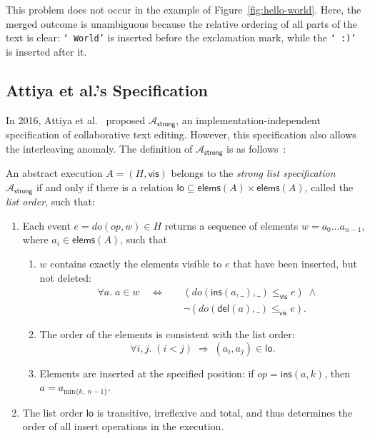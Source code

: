 \documentclass[sigconf]{acmart}
\begin{document}
This problem does not occur in the example of Figure~\ref{fig:hello-world}.
Here, the merged outcome is unambiguous because the relative ordering of all parts of the text is clear: \texttt{` World'} is inserted before the exclamation mark, while the \texttt{` :)'} is inserted after it.

\subsection{Attiya et al.'s Specification}

In 2016, Attiya et al.~\cite{Attiya:2016kh} proposed $\mathcal{A}_\textsf{strong}$, an implementation-independent specification of collaborative text editing.
However, this specification also allows the interleaving anomaly.
The definition of $\mathcal{A}_\textsf{strong}$ is as follows~\cite{Attiya:2016kh}:

\begin{displayquote}
  An abstract execution $A = (H, \textsf{vis})$ belongs to the \emph{strong list specification} $\mathcal{A}_\textsf{strong}$ if and only if there is a relation $\textsf{lo} \subseteq \textsf{elems}(A) \times \textsf{elems}(A)$, called the \emph{list order}, such that:
  \begin{enumerate}
    \item Each event $e = \mathit{do}(\mathit{op}, w) \in H$ returns a sequence of elements $w=a_0 \dots a_{n-1}$, where $a_i \in \textsf{elems}(A)$, such that
    \begin{enumerate}
      \item $w$ contains exactly the elements visible to $e$ that have been inserted, but not deleted:
	    \begin{align*}
          \quad\forall a.\; a \in w \quad\Longleftrightarrow\quad &
		  (\mathit{do}(\textsf{ins}(a, \_), \_) \le_\textsf{vis} e) \;\wedge\\ &
		  \neg(\mathit{do}(\textsf{del}(a), \_) \le_\textsf{vis} e).
		\end{align*}
      \item The order of the elements is consistent with the list order:
        \[ \forall i, j.\; (i < j) \;\Longrightarrow\; (a_i, a_j) \in \textsf{lo}. \]
      \item Elements are inserted at the specified position:
        if $\mathit{op} = \textsf{ins}(a, k)$, then $a = a_{\mathrm{min} \{k,\; n-1\}}$.
    \end{enumerate}
    \item The list order $\textsf{lo}$ is transitive, irreflexive and total, and thus determines the order of all insert operations in the execution.
  \end{enumerate}
\end{displayquote}
\end{document}
